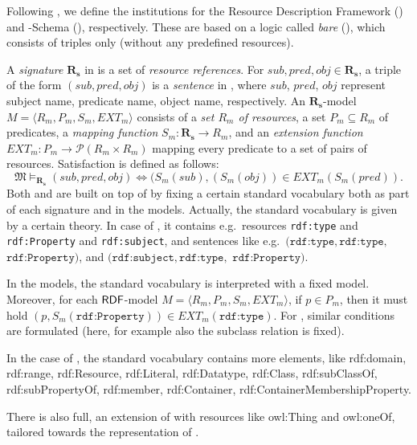 \documentclass[10pt,%
\ifpretendfinal
final%
\else
draft%
\fi,
]{scrreprt}
\begin{document}
\begin{definition}
Following \cite{Lucanu}, 
we define the institutions for the Resource Description
Framework (\RDF) and \RDF-Schema (\RDFS), respectively. 
These are based on a logic called \emph{bare} \RDF (\SimpleRDF), which consists
of triples only (without any predefined resources).

A \textit{signature} $\mathbf{R_s}$ in \SimpleRDF is a set of
\textit{resource references}. For $sub, pred, obj \in \mathbf{R_s}$, a
triple of the form $(sub, pred, obj)$ is a \textit{sentence} in \SimpleRDF,
where $sub$, $pred$, $obj$ represent subject name, predicate name,
object name, respectively. An $\mathbf{R_s}$-model $M =
\langle R_m, P_m, S_m, EXT_m \rangle$ consists of a \textit{set $R_m$
  of resources}, a set $P_m \subseteq R_m$ of predicates, a
\textit{mapping function} $S_m:\mathbf{R_s} \rightarrow R_m$, and an
\textit{extension function} $EXT_m: P_m \rightarrow \mathcal{P}(R_m
\times R_m)$ mapping every predicate to a set of pairs of
resources. Satisfaction is defined as follows:
%
\[\mathfrak{M} \models_{\mathbf{R_s}} (sub, pred, obj) \Leftrightarrow (S_{m}(sub),
(S_{m}(obj)) \in EXT_{m} (S_m(pred)). \]
%
Both \RDF and \RDFS are built on top of \SimpleRDF by fixing a certain
standard vocabulary both as part of each signature and in the models.
Actually, the standard vocabulary is given by a certain theory. In case
of \RDF, it contains e.g.\ resources \texttt{rdf:type} and
\texttt{rdf:Property} and \texttt{rdf:subject}, and sentences like e.g.\
$(\texttt{rdf:type},\texttt{rdf:type},$ $ \texttt{rdf:Property})$, and $(\texttt{rdf:subject}, \texttt{rdf:type},$  $\texttt{rdf:Property})$.

In the models, the standard vocabulary is interpreted with a fixed
model.  Moreover, for each $\mathsf{RDF}$-model $M = \langle R_m, P_m, S_m,
EXT_m \rangle$, if $p\in P_m$, then it must hold
$(p,S_m(\texttt{rdf:Property}))\in EXT_m(\texttt{rdf:type})$.
For \RDFS, similar conditions are formulated (here, for example also
the subclass relation is fixed).


In the case of \RDFS, the standard vocabulary contains more elements,
like
rdf:domain,
rdf:range, rdf:Resource, rdf:Literal, rdf:Datatype, rdf:Class,
rdf:subClassOf, rdf:subPropertyOf, rdf:member, rdf:Container,
rdf:ContainerMembershipProperty.

There is also \OWL full, an extension of \RDFS with resources
like owl:Thing and owl:oneOf, tailored towards the representation of
\OWL.

\end{definition}
\end{document}
